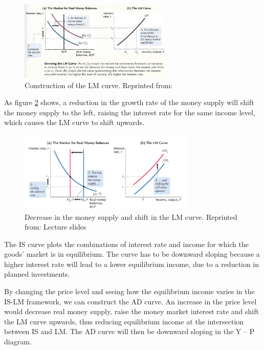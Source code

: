 \documentclass[11pt,a4paper,oneside]{book}
\begin{document}
\begin{figure}[h!]
  \centering
    \includegraphics[width=0.65\textwidth]{LM_curve.jpg}
    \caption{Construction of the LM curve. Reprinted from: \citet*[p. 331]{Mankiw_2016}}
    \label{fig:LM_curve}
\end{figure}

As figure \ref{fig:LM_curve_shift} shows, a reduction in the growth rate of the money supply will shift the money supply to the left, raising the interest rate for the same income level, which causes the LM curve to shift upwards.

\begin{figure}[h!]
  \centering
    \includegraphics[width=0.75\textwidth]{LM_curve_shift.jpg}
    \caption{Decrease in the money supply and shift in the LM curve. Reprinted from: Lecture slides}
    \label{fig:LM_curve_shift}
\end{figure}

The IS curve plots the combinations of interest rate and income for which the goods’ market is in equilibrium. The curve has to be downward sloping because a higher interest rate will lead to a lower equilibrium income, due to a reduction in planned investments.

By changing the price level and seeing how the equilibrium income varies in the IS-LM framework, we can construct the AD curve. An increase in the price level would decrease real money supply, raise the money market interest rate and shift the LM curve upwards, thus reducing equilibrium income at the intersection between IS and LM. The AD curve will then be downward sloping in the Y – P diagram.
\end{document}

